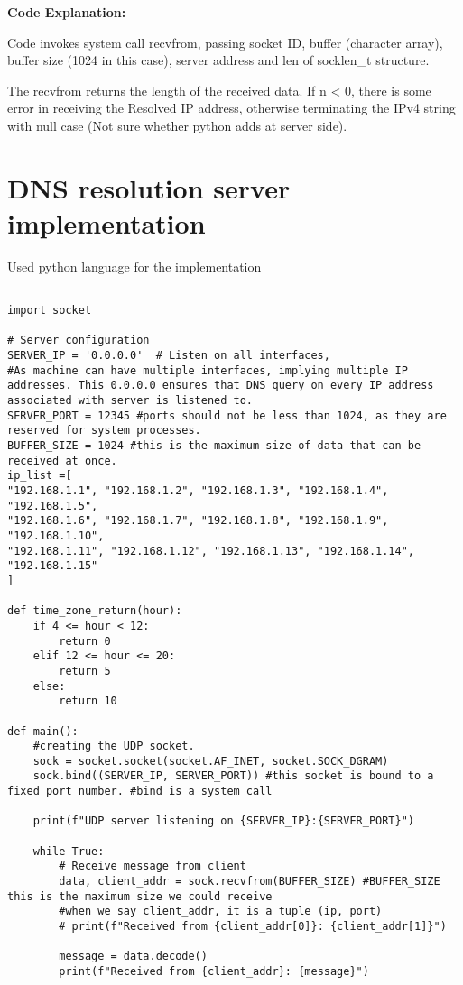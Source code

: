 \documentclass[12pt, a4paper]{report}
\begin{document}
\textbf{Code Explanation: }

Code invokes system call recvfrom, passing socket ID, buffer (character array), buffer size (1024 in this case), server address and len of socklen\_t structure.

The recvfrom returns the length of the received data. If n < 0, there is some error in receiving the Resolved IP address, otherwise terminating the IPv4 string with null case (Not sure whether python adds at server side).
\newpage
\section{DNS resolution server implementation}

Used python language for the implementation 


\begin{lstlisting}[caption={}]

import socket

# Server configuration
SERVER_IP = '0.0.0.0'  # Listen on all interfaces, 
#As machine can have multiple interfaces, implying multiple IP addresses. This 0.0.0.0 ensures that DNS query on every IP address associated with server is listened to.
SERVER_PORT = 12345 #ports should not be less than 1024, as they are reserved for system processes.
BUFFER_SIZE = 1024 #this is the maximum size of data that can be received at once.
ip_list =[
"192.168.1.1", "192.168.1.2", "192.168.1.3", "192.168.1.4", "192.168.1.5",
"192.168.1.6", "192.168.1.7", "192.168.1.8", "192.168.1.9", "192.168.1.10",
"192.168.1.11", "192.168.1.12", "192.168.1.13", "192.168.1.14", "192.168.1.15"
]

def time_zone_return(hour):
    if 4 <= hour < 12:
        return 0
    elif 12 <= hour <= 20:
        return 5
    else:
        return 10

def main():
    #creating the UDP socket.
    sock = socket.socket(socket.AF_INET, socket.SOCK_DGRAM)
    sock.bind((SERVER_IP, SERVER_PORT)) #this socket is bound to a fixed port number. #bind is a system call 

    print(f"UDP server listening on {SERVER_IP}:{SERVER_PORT}")

    while True:
        # Receive message from client
        data, client_addr = sock.recvfrom(BUFFER_SIZE) #BUFFER_SIZE this is the maximum size we could receive
        #when we say client_addr, it is a tuple (ip, port)
        # print(f"Received from {client_addr[0]}: {client_addr[1]}")
        
        message = data.decode()
        print(f"Received from {client_addr}: {message}")


\end{lstlisting}
\end{document}
